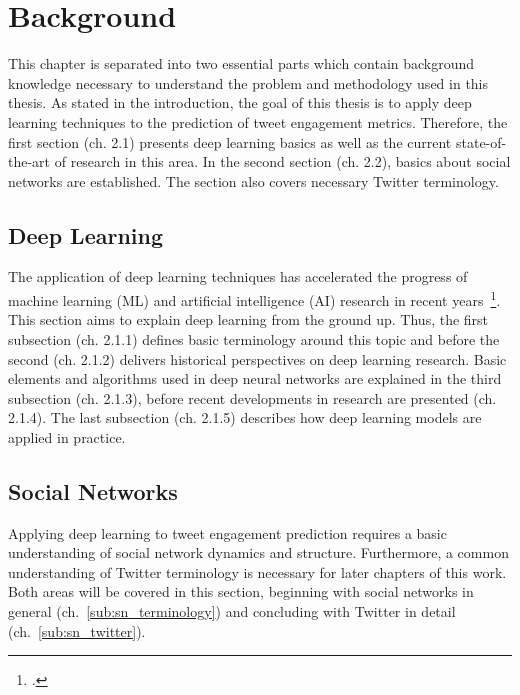 \section{Background}
\label{ch:background}

This chapter is separated into two essential parts which contain background
knowledge necessary to understand the problem and methodology used in this 
thesis. As stated in the introduction, the goal of this thesis is to apply deep
learning techniques to the prediction of tweet engagement metrics. Therefore,
the first section (ch. 2.1) presents deep learning basics as well as the current
state-of-the-art of research in this area. In the second section (ch. 2.2), 
basics about social networks are established. The section also covers necessary 
Twitter terminology.

\subsection{Deep Learning}
\label{sec:deep_learning}

The application of deep learning techniques has accelerated the progress of 
machine learning (ML) and artificial intelligence (AI) research in recent years~\footcite{Brynjolfsson2017}. 
This section aims to explain deep learning from the ground up. Thus, the 
first subsection (ch. 2.1.1) defines basic terminology around this topic 
and before the second (ch. 2.1.2) delivers historical perspectives on deep learning research. 
Basic elements and algorithms used in deep neural networks are explained in the third 
subsection (ch. 2.1.3), before recent developments in research are
presented (ch. 2.1.4). The last subsection (ch. 2.1.5) describes how
deep learning models are applied in practice.











\subsection{Social Networks}
\label{sec:social_networks}

Applying deep learning to tweet engagement prediction requires a basic
understanding of social network dynamics and structure. Furthermore, a common
understanding of Twitter terminology is necessary for later chapters of this
work. Both areas will be covered in this section, beginning with social
networks in general (ch.~\ref{sub:sn_terminology}) and concluding with
Twitter in detail (ch.~\ref{sub:sn_twitter}).




